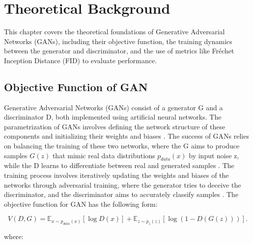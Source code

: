 \chapter{Theoretical Background}
\label{Theoretical Background for GAN}
This chapter covers the theoretical foundations of Generative Adversarial Networks (GANs),
including their objective function, the training dynamics between the generator and discriminator, 
and the use of metrics like Fréchet Inception Distance (FID) to evaluate performance. 



\section{Objective Function of GAN}

Generative Adversarial Networks (GANs) consist of a generator G and a discriminator D, 
both implemented using artificial neural networks. The parametrization of GANs involves 
defining the network structure of these components and initializing their weights and biases \citep{10.1007/s10928-021-09787-4}. 
The success of GANs relies on balancing the training of these two networks, where the 
G aims to produce samples $G(z)$ that mimic real data distributions $p_{data}(x)$ by input noise z, while the D 
learns to differentiate between real and generated samples \citep{10.1109/taslp.2017.2761547}. 
The training process involves iteratively updating the weights and biases of the networks through 
adversarial training, where the generator tries to deceive the discriminator, and the discriminator 
aims to accurately classify samples \citep{10.48550/arxiv.1802.05637}.
The objective function for GAN has the following form:


\begin{equation}
    \label{eq:min & max}
    V(D, G) = \mathbb{E}_{x \sim p_{data}(x)} [\log D(x)] + \mathbb{E}_{z \sim p_{z}(z)} [\log(1 - D(G(z)))].
\end{equation}

where:

